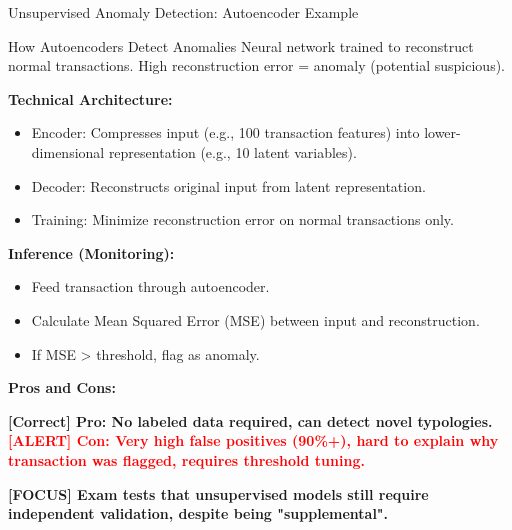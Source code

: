 \documentclass[11pt,a4paper]{beamer}
\newcommand{\redflag}[1]{\textcolor{red}{\textbf{[ALERT] #1}}}
\newcommand{\greennote}[1]{\textcolor{green!50!black}{\textbf{[Correct] #1}}}
\newcommand{\examfocus}[1]{\textcolor{orange!80!black}{\textbf{[FOCUS] #1}}}
\begin{document}
\begin{frame}{Unsupervised Anomaly Detection: Autoencoder Example}
	\begin{block}{How Autoencoders Detect Anomalies}
		Neural network trained to reconstruct normal transactions. High reconstruction error = anomaly (potential suspicious).
	\end{block}
	\textbf{Technical Architecture:}
	\begin{itemize}
		\item Encoder: Compresses input (e.g., 100 transaction features) into lower-dimensional representation (e.g., 10 latent variables).
		\item Decoder: Reconstructs original input from latent representation.
		\item Training: Minimize reconstruction error on normal transactions only.
	\end{itemize}
	\textbf{Inference (Monitoring):}
	\begin{itemize}
		\item Feed transaction through autoencoder.
		\item Calculate Mean Squared Error (MSE) between input and reconstruction.
		\item If MSE > threshold, flag as anomaly.
	\end{itemize}
	\textbf{Pros and Cons:}
	\begin{itemize}
		\greennote{Pro: No labeled data required, can detect novel typologies.}
		\redflag{Con: Very high false positives (90\%+), hard to explain why transaction was flagged, requires threshold tuning.}
	\end{itemize}
	\examfocus{Exam tests that unsupervised models still require independent validation, despite being "supplemental".}
\end{frame}
\end{document}
